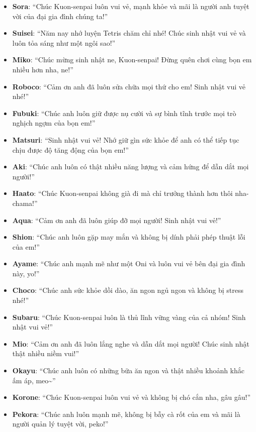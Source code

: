 \documentclass[../main.tex]{subfiles}
\begin{document}
\begin{itemize}
    \item \textbf{Sora}: ``Chúc Kuon-senpai luôn vui vẻ, mạnh khỏe và mãi là người anh tuyệt vời của đại gia đình chúng ta!''
    \item \textbf{Suisei}: ``Năm nay nhớ luyện Tetris chăm chỉ nhé! Chúc sinh nhật vui vẻ và luôn tỏa sáng như một ngôi sao!''
    \item \textbf{Miko}: ``Chúc mừng sinh nhật ne, Kuon-senpai! Đừng quên chơi cùng bọn em nhiều hơn nha, ne!''
    \item \textbf{Roboco}: ``Cảm ơn anh đã luôn sửa chữa mọi thứ cho em! Sinh nhật vui vẻ nhé!''
    \item \textbf{Fubuki}: ``Chúc anh luôn giữ được nụ cười và sự bình tĩnh trước mọi trò nghịch ngợm của bọn em!''
    \item \textbf{Matsuri}: ``Sinh nhật vui vẻ! Nhớ giữ gìn sức khỏe để anh có thể tiếp tục chịu được độ tăng động của bọn em!''
    \item \textbf{Aki}: ``Chúc anh luôn có thật nhiều năng lượng và cảm hứng để dẫn dắt mọi người!''
    \item \textbf{Haato}: ``Chúc Kuon-senpai không già đi mà chỉ trưởng thành hơn thôi nha-chama!''
    \item \textbf{Aqua}: ``Cảm ơn anh đã luôn giúp đỡ mọi người! Sinh nhật vui vẻ!''
    \item \textbf{Shion}: ``Chúc anh luôn gặp may mắn và không bị dính phải phép thuật lỗi của em!''
    \item \textbf{Ayame}: ``Chúc anh mạnh mẽ như một Oni và luôn vui vẻ bên đại gia đình này, yo!''
    \item \textbf{Choco}: ``Chúc anh sức khỏe dồi dào, ăn ngon ngủ ngon và không bị stress nhé!''
    \item \textbf{Subaru}: ``Chúc Kuon-senpai luôn là thủ lĩnh vững vàng của cả nhóm! Sinh nhật vui vẻ!''
    \item \textbf{Mio}: ``Cảm ơn anh đã luôn lắng nghe và dẫn dắt mọi người! Chúc sinh nhật thật nhiều niềm vui!''
    \item \textbf{Okayu}: ``Chúc anh luôn có những bữa ăn ngon và thật nhiều khoảnh khắc ấm áp, meo\~{}''
    \item \textbf{Korone}: ``Chúc Kuon-senpai luôn vui vẻ và không bị chó cắn nha, gâu gâu!''
    \item \textbf{Pekora}: ``Chúc anh luôn mạnh mẽ, không bị bẫy cà rốt của em và mãi là người quản lý tuyệt vời, peko!''

\end{itemize}
\end{document}
